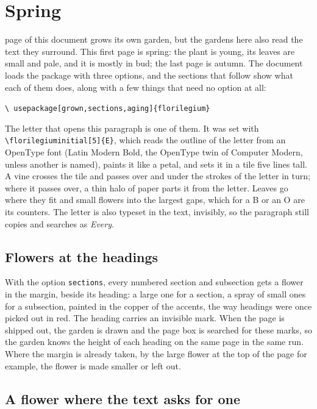 \documentclass[11pt,a4paper]{article}
\newcommand\code[1]{\texttt{\small #1}}
\begin{document}
\section{Spring}

 page of this document grows its own
garden, but the
gardens here also read the text they surround. This first page is
spring: the plant is
young, its leaves are small and pale, and it is mostly in bud; the
last page is autumn.
The document loads the package with three options, and the sections
that follow show what
each of them does, along with a few things that need no option at all:
\begin{center}\code{\textbackslash
  usepackage[grown,sections,aging]\{florilegium\}}
\end{center}

The letter that opens this paragraph is one of them. It was set with
\code{\textbackslash florilegiuminitial[5]\{E\}}, which reads the
outline of the letter from an OpenType font (Latin
  Modern Bold, the OpenType twin of Computer Modern, unless another is
named), paints it
like a petal, and sets it in a tile five lines tall. A vine crosses
the tile and passes
over and under the strokes of the letter in turn; where it passes
over, a thin halo of
paper parts it from the letter. Leaves go where they fit and small
flowers into the
largest gaps, which for a B or an O are its counters. The letter is
also typeset in the
text, invisibly, so the paragraph still copies and searches as \emph{Every}.

\subsection{Flowers at the headings}

With the option \code{sections}, every numbered section and
subsection gets a flower in the
margin, beside its heading: a large one for a section, a spray of
small ones for a
subsection, painted in the copper of the accents, the way headings
were once picked out in
red. The heading carries an invisible mark. When the page is shipped out, the
garden is drawn and the page box is searched for these marks, so the
garden knows the
height of each heading on the same page in the same run. Where the
margin is already
taken, by the large flower at the top of the page for example, the
flower is made
smaller or left out.

\subsection{A flower where the text asks for one}
\end{document}
